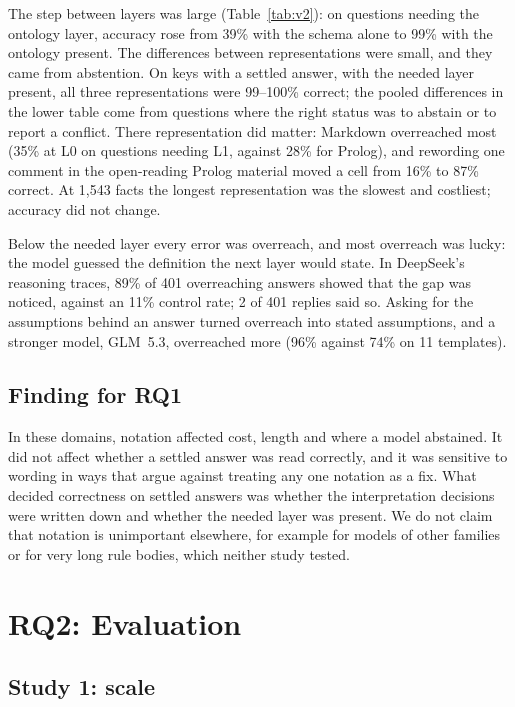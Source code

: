 \documentclass[11pt]{article}
\begin{document}
The step between layers was large (Table~\ref{tab:v2}): on questions needing the ontology layer, accuracy rose from
39\% with the schema alone to 99\% with the ontology present. The differences between representations were small,
and they came from abstention. On keys with a settled answer, with the needed layer present, all three
representations were 99--100\% correct; the pooled differences in the lower table come from questions where the
right status was to abstain or to report a conflict. There representation did matter: Markdown overreached most
(35\% at L0 on questions needing L1, against 28\% for Prolog), and rewording one comment in the open-reading Prolog
material moved a cell from 16\% to 87\% correct. At 1,543 facts the longest representation was the slowest and
costliest; accuracy did not change.

Below the needed layer every error was overreach, and most overreach was lucky: the model guessed the definition the
next layer would state. In DeepSeek's reasoning traces, 89\% of 401 overreaching answers showed that the gap was
noticed, against an 11\% control rate; 2 of 401 replies said so. Asking for the assumptions behind an answer turned
overreach into stated assumptions, and a stronger model, GLM~5.3, overreached more (96\% against 74\% on 11
templates).

\subsection{Finding for RQ1}

In these domains, notation affected cost, length and where a model abstained. It did not affect whether a settled
answer was read correctly, and it was sensitive to wording in ways that argue against treating any one notation as
a fix. What decided correctness on settled answers was whether the interpretation decisions were written down and
whether the needed layer was present. We do not claim that notation is unimportant elsewhere, for example for
models of other families or for very long rule bodies, which neither study tested.

\section{RQ2: Evaluation}
\label{sec:rq2}

\subsection{Study 1: scale}
\end{document}
